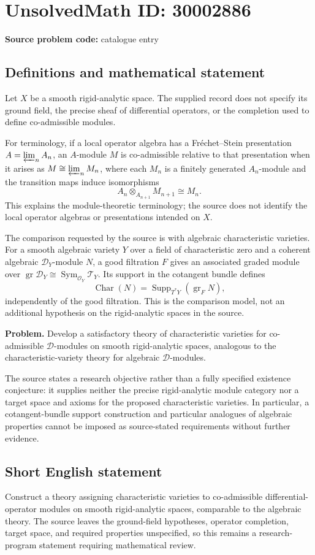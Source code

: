 \documentclass[11pt]{article}
\begin{document}
\section*{UnsolvedMath ID: 30002886}
\textbf{Source problem code:} catalogue entry
\subsection{Definitions and mathematical statement}
Let \(X\) be a smooth rigid-analytic space. The supplied record does not specify its ground field, the precise sheaf of differential operators, or the completion used to define co-admissible modules.

For terminology, if a local operator algebra has a Fr\'echet--Stein presentation \(A=\varprojlim_n A_n\), an \(A\)-module \(M\) is co-admissible relative to that presentation when it arises as \(M\cong\varprojlim_n M_n\), where each \(M_n\) is a finitely generated \(A_n\)-module and the transition maps induce isomorphisms
\[
A_n\otimes_{A_{n+1}}M_{n+1}\cong M_n.
\]
This explains the module-theoretic terminology; the source does not identify the local operator algebras or presentations intended on \(X\).

The comparison requested by the source is with algebraic characteristic varieties. For a smooth algebraic variety \(Y\) over a field of characteristic zero and a coherent algebraic \(\mathcal D_Y\)-module \(N\), a good filtration \(F\) gives an associated graded module over \(\operatorname{gr}\mathcal D_Y\cong\operatorname{Sym}_{\mathcal O_Y}\mathcal T_Y\). Its support in the cotangent bundle defines
\[
\operatorname{Char}(N)=\operatorname{Supp}_{T^*Y}(\operatorname{gr}_F N),
\]
independently of the good filtration. This is the comparison model, not an additional hypothesis on the rigid-analytic spaces in the source.

\textbf{Problem.} Develop a satisfactory theory of characteristic varieties for co-admissible \(\mathcal D\)-modules on smooth rigid-analytic spaces, analogous to the characteristic-variety theory for algebraic \(\mathcal D\)-modules.

The source states a research objective rather than a fully specified existence conjecture: it supplies neither the precise rigid-analytic module category nor a target space and axioms for the proposed characteristic varieties. In particular, a cotangent-bundle support construction and particular analogues of algebraic properties cannot be imposed as source-stated requirements without further evidence.
\subsection{Short English statement}
Construct a theory assigning characteristic varieties to co-admissible differential-operator modules on smooth rigid-analytic spaces, comparable to the algebraic theory. The source leaves the ground-field hypotheses, operator completion, target space, and required properties unspecified, so this remains a research-program statement requiring mathematical review.
\end{document}

